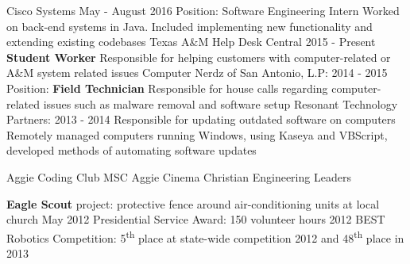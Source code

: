 \documentclass[12pt]{article}
\begin{document}
\begin{flushleft}
\begin{outline}[compactitem]
  \1 Cisco Systems \hfill May - August 2016
    \2 Position: Software Engineering Intern
    \2 Worked on back-end systems in Java. Included implementing new functionality and extending existing codebases
  \1 Texas A\&M Help Desk Central \hfill 2015 - Present
    \2 \textbf{Student Worker}
    \2 Responsible for helping customers with computer-related or A\&M system related issues
  \1 Computer Nerdz of San Antonio, L.P: \hfill 2014 - 2015
    \2 Position: \textbf{Field Technician}
    \2 Responsible for house calls regarding computer-related issues such as malware removal and software setup
  \1 Resonant Technology Partners: \hfill 2013 - 2014
    \2 Responsible for updating outdated software on computers
    \2 Remotely managed computers running Windows, using Kaseya and VBScript, developed methods of automating software updates

  \1 Aggie Coding Club \hfill{}\hspace{1px} MSC Aggie Cinema \hfill{}\hspace{1px} Christian Engineering Leaders

  \1 \textbf{Eagle Scout} project: protective fence around air-conditioning units at local church \hfill May 2012
  \1 Presidential Service Award: 150 volunteer hours \hfill 2012
  \1 BEST Robotics Competition: 5\textsuperscript{th} place at state-wide competition 2012 and 48\textsuperscript{th} place in 2013

\end{outline}
\end{flushleft}
\end{document}
